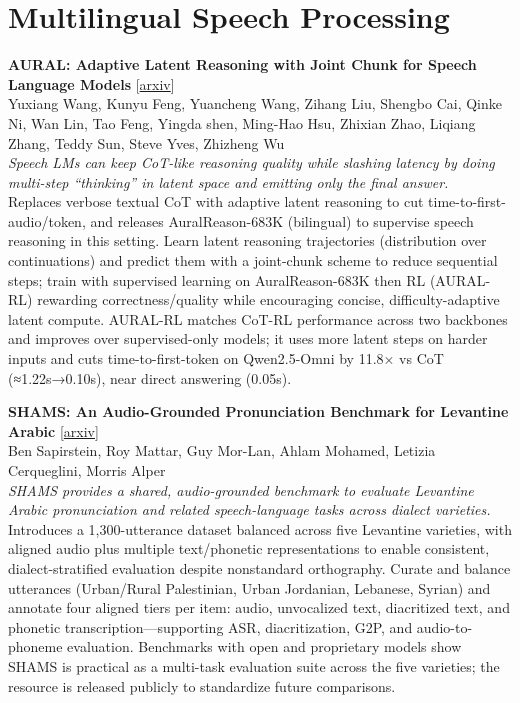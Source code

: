 \documentclass[12pt,letterpaper]{article}
\begin{document}
\medskip


\section*{Multilingual Speech Processing}

{\small\textbf{AURAL: Adaptive Latent Reasoning with Joint Chunk for Speech Language Models}} {\scriptsize[\href{https://arxiv.org/abs/2610.01560}{arxiv}]}\\
{\scriptsize Yuxiang Wang, Kunyu Feng, Yuancheng Wang, Zihang Liu, Shengbo Cai, Qinke Ni, Wan Lin, Tao Feng, Yingda shen, Ming-Hao Hsu, Zhixian Zhao, Liqiang Zhang, Teddy Sun, Steve Yves, Zhizheng Wu}\\

{\small\textit{Speech LMs can keep CoT-like reasoning quality while slashing latency by doing multi-step ``thinking'' in latent space and emitting only the final answer.}}\\[1pt]
{\footnotesize Replaces verbose textual CoT with adaptive latent reasoning to cut time-to-first-audio/token, and releases AuralReason-683K (bilingual) to supervise speech reasoning in this setting. Learn latent reasoning trajectories (distribution over continuations) and predict them with a joint-chunk scheme to reduce sequential steps; train with supervised learning on AuralReason-683K then RL (AURAL-RL) rewarding correctness/quality while encouraging concise, difficulty-adaptive latent compute. AURAL-RL matches CoT-RL performance across two backbones and improves over supervised-only models; it uses more latent steps on harder inputs and cuts time-to-first-token on Qwen2.5-Omni by 11.8× vs CoT (≈1.22s→0.10s), near direct answering (0.05s).}

\medskip

{\small\textbf{SHAMS: An Audio-Grounded Pronunciation Benchmark for Levantine Arabic}} {\scriptsize[\href{https://arxiv.org/abs/2610.01427}{arxiv}]}\\
{\scriptsize Ben Sapirstein, Roy Mattar, Guy Mor-Lan, Ahlam Mohamed, Letizia Cerqueglini, Morris Alper}\\

{\small\textit{SHAMS provides a shared, audio-grounded benchmark to evaluate Levantine Arabic pronunciation and related speech-language tasks across dialect varieties.}}\\[1pt]
{\footnotesize Introduces a 1,300-utterance dataset balanced across five Levantine varieties, with aligned audio plus multiple text/phonetic representations to enable consistent, dialect-stratified evaluation despite nonstandard orthography. Curate and balance utterances (Urban/Rural Palestinian, Urban Jordanian, Lebanese, Syrian) and annotate four aligned tiers per item: audio, unvocalized text, diacritized text, and phonetic transcription---supporting ASR, diacritization, G2P, and audio-to-phoneme evaluation. Benchmarks with open and proprietary models show SHAMS is practical as a multi-task evaluation suite across the five varieties; the resource is released publicly to standardize future comparisons.}
\end{document}
